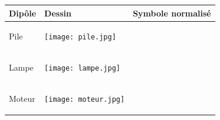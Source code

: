 \documentclass[11pt]{article}
\begin{document}
		\begin{center}
			
		\begin{tabular}{ |p{6cm}|p{6cm}|p{6cm}|  }
			\hline
			Dipôle 						& Dessin & Symbole normalisé \\\hline\hline
			Pile 						& 
			\begin{minipage}{.3\textwidth}
				\begin{center}
					\texttt{[image: pile.jpg]}
				\end{center}
			  \end{minipage} &  \\\hline

			Lampe 	&
			\begin{minipage}{.3\textwidth}
				\begin{center}
					\texttt{[image: lampe.jpg]}
				\end{center}
			  \end{minipage} &  \\\hline

			Moteur	& 
			\begin{minipage}{.3\textwidth}
				\begin{center}
					\texttt{[image: moteur.jpg]}
				\end{center}
			  \end{minipage}  &  \\\hline


\end{tabular}
\end{center}
\end{document}
